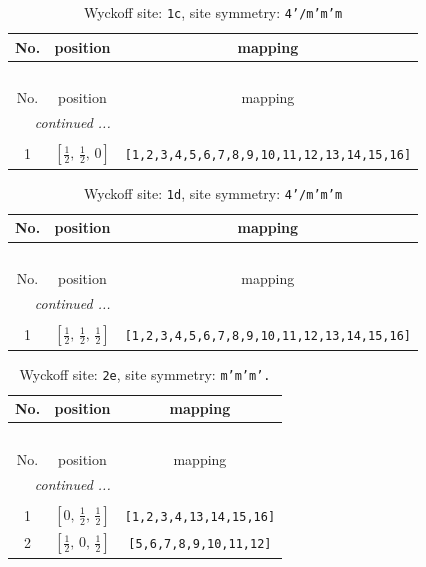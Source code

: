 \documentclass[fleqn,8pt]{jsarticle}
\begin{document}
\begin{longtable}{ccc}
\caption{Wyckoff site: {\tt 1c}, site symmetry: {\tt 4'/m'm'm}}
 \\
 \hline \hline
No. & position & mapping \\ \hline \endfirsthead

\multicolumn{2}{l}{\tablename\ \thetable{}} \\
 \hline \hline
No. & position & mapping \\ \hline \endhead

 \hline \hline
\multicolumn{2}{r}{\footnotesize\it continued ...} \\ \endfoot

 \hline \hline
\multicolumn{2}{r}{} \\ \endlastfoot

1 & $\left[ \frac{1}{2},\, \frac{1}{2},\, 0 \right]$ & {\tt [1,2,3,4,5,6,7,8,9,10,11,12,13,14,15,16]} \\
\end{longtable}
\renewcommand{\arraystretch}{1.2}
\begin{longtable}{ccc}
\caption{Wyckoff site: {\tt 1d}, site symmetry: {\tt 4'/m'm'm}}
 \\
 \hline \hline
No. & position & mapping \\ \hline \endfirsthead

\multicolumn{2}{l}{\tablename\ \thetable{}} \\
 \hline \hline
No. & position & mapping \\ \hline \endhead

 \hline \hline
\multicolumn{2}{r}{\footnotesize\it continued ...} \\ \endfoot

 \hline \hline
\multicolumn{2}{r}{} \\ \endlastfoot

1 & $\left[ \frac{1}{2},\, \frac{1}{2},\, \frac{1}{2} \right]$ & {\tt [1,2,3,4,5,6,7,8,9,10,11,12,13,14,15,16]} \\
\end{longtable}
\renewcommand{\arraystretch}{1.2}
\begin{longtable}{ccc}
\caption{Wyckoff site: {\tt 2e}, site symmetry: {\tt m'm'm'.}}
 \\
 \hline \hline
No. & position & mapping \\ \hline \endfirsthead

\multicolumn{2}{l}{\tablename\ \thetable{}} \\
 \hline \hline
No. & position & mapping \\ \hline \endhead

 \hline \hline
\multicolumn{2}{r}{\footnotesize\it continued ...} \\ \endfoot

 \hline \hline
\multicolumn{2}{r}{} \\ \endlastfoot

1 & $\left[ 0,\, \frac{1}{2},\, \frac{1}{2} \right]$ & {\tt [1,2,3,4,13,14,15,16]} \\ \hline
2 & $\left[ \frac{1}{2},\, 0,\, \frac{1}{2} \right]$ & {\tt [5,6,7,8,9,10,11,12]} \\
\end{longtable}
\end{document}
